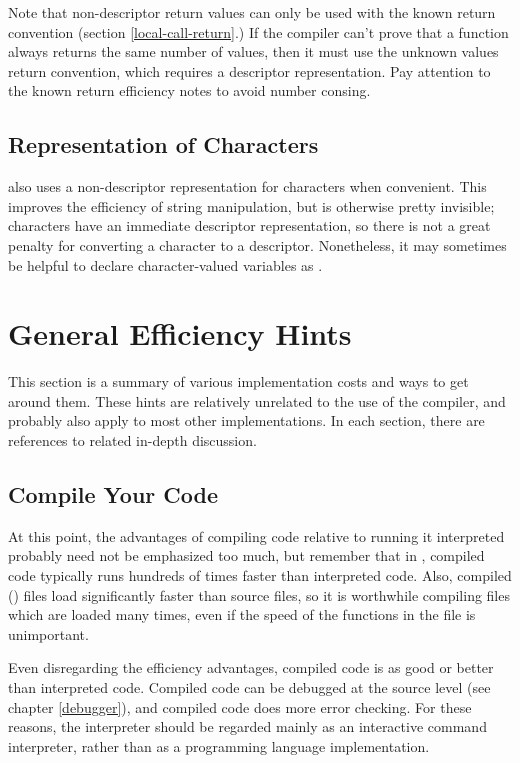 Note that non-descriptor return values can only be used with the known return
convention (section \ref{local-call-return}.)  If the compiler can't prove that
a function always returns the same number of values, then it must use the
unknown values return convention, which requires a descriptor representation.
Pay attention to the known return efficiency notes to avoid number consing.
 

\subsection{Representation of Characters}
\label{characters}

\python{} also uses a non-descriptor representation for characters when
convenient.  This improves the efficiency of string manipulation, but is
otherwise pretty invisible; characters have an immediate descriptor
representation, so there is not a great penalty for converting a character to a
descriptor.  Nonetheless, it may sometimes be helpful to declare
character-valued variables as .


\section{General Efficiency Hints}
\label{general-efficiency}

This section is a summary of various implementation costs and ways to get
around them.  These hints are relatively unrelated to the use of the \python{}
compiler, and probably also apply to most other \llisp{} implementations.  In
each section, there are references to related in-depth discussion.


\subsection{Compile Your Code}

At this point, the advantages of compiling code relative to running it
interpreted probably need not be emphasized too much, but remember that
in \cmucl, compiled code typically runs hundreds of times faster than
interpreted code.  Also, compiled () files load significantly faster
than source files, so it is worthwhile compiling files which are loaded many
times, even if the speed of the functions in the file is unimportant.

Even disregarding the efficiency advantages, compiled code is as good or better
than interpreted code.  Compiled code can be debugged at the source level (see
chapter \ref{debugger}), and compiled code does more error checking.  For these
reasons, the interpreter should be regarded mainly as an interactive command
interpreter, rather than as a programming language implementation.

